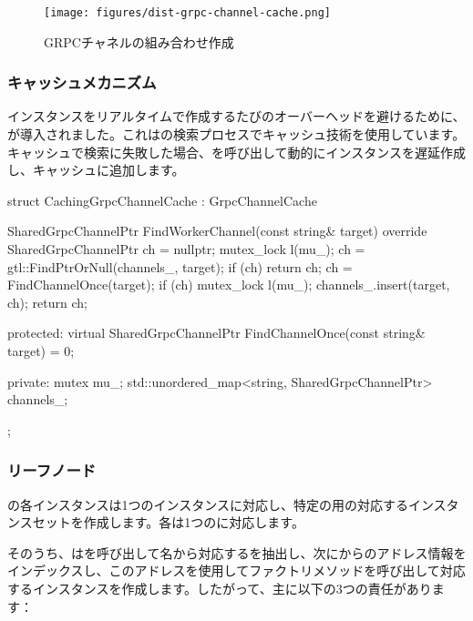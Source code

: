 \begin{content}
\begin{figure}[H]
\centering
\texttt{[image: figures/dist-grpc-channel-cache.png]}
\caption{GRPCチャネルの組み合わせ作成}
 \label{fig:dist-grpc-channel-cache}
\end{figure}

\subsubsection{キャッシュメカニズム}

インスタンスをリアルタイムで作成するたびのオーバーヘッドを避けるために、が導入されました。これはの検索プロセスでキャッシュ技術を使用しています。キャッシュで検索に失敗した場合、を呼び出して動的にインスタンスを遅延作成し、キャッシュに追加します。

\begin{leftbar}
\begin{c++}
struct CachingGrpcChannelCache : GrpcChannelCache {
  SharedGrpcChannelPtr FindWorkerChannel(const string& target) override {
    SharedGrpcChannelPtr ch = nullptr;
    {
      mutex_lock l(mu_);
      ch = gtl::FindPtrOrNull(channels_, target);
      if (ch) {
        return ch;
      }
    }
    ch = FindChannelOnce(target);
    if (ch) {
      mutex_lock l(mu_);
      channels_.insert({target, ch});
    }
    return ch;
  }

 protected:
  virtual SharedGrpcChannelPtr FindChannelOnce(const string& target) = 0;

 private:
  mutex mu_;
  std::unordered_map<string, SharedGrpcChannelPtr> channels_;
};
\end{c++}
\end{leftbar}

\subsubsection{リーフノード}

の各インスタンスは1つのインスタンスに対応し、特定の用の対応するインスタンスセットを作成します。各は1つのに対応します。

そのうち、はを呼び出して名から対応するを抽出し、次にからのアドレス情報をインデックスし、このアドレスを使用してファクトリメソッドを呼び出して対応するインスタンスを作成します。したがって、主に以下の3つの責任があります：


\end{content}
